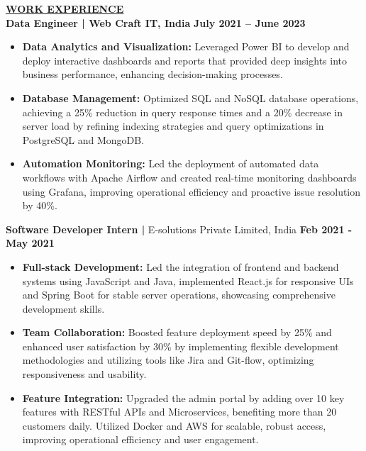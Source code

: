 \documentclass{article}
\begin{document}
\noindent \textbf{\underline{WORK EXPERIENCE}} \\
\noindent \textbf{Data Engineer | Web Craft IT, India}  \hfill \textbf{July 2021 – June 2023}
\begin{itemize}[noitemsep,nolistsep,leftmargin=*]
\item {\small \textbf{Data Analytics and Visualization:} Leveraged Power BI to develop and deploy interactive dashboards and reports that provided deep insights into business performance, enhancing decision-making processes.}
\item {\small \textbf{Database Management:} Optimized SQL and NoSQL database operations, achieving a 25\% reduction in query response times and a 20\% decrease in server load by refining indexing strategies and query optimizations in PostgreSQL and MongoDB.}
\item {\small \textbf{Automation Monitoring:} Led the deployment of automated data workflows with Apache Airflow and created real-time monitoring dashboards using Grafana, improving operational efficiency and proactive issue resolution by 40\%.}
\end{itemize}
\begin{itemize}
\end{itemize}
\noindent \textbf{Software Developer Intern | } E-solutions Private Limited, India \hfill \textbf{Feb 2021 - May 2021}
\begin{itemize}[noitemsep,nolistsep,leftmargin=*]
\item {\small \textbf{Full-stack Development:} Led the integration of frontend and backend systems using JavaScript and Java, implemented React.js for responsive UIs and Spring Boot for stable server operations, showcasing comprehensive development skills.}
\item {\small \textbf{Team Collaboration:} Boosted feature deployment speed by 25\% and enhanced user satisfaction by 30\% by implementing flexible development methodologies and utilizing tools like Jira and Git-flow, optimizing responsiveness and usability.}
\item {\small \textbf{Feature Integration:} Upgraded the admin portal by adding over 10 key features with RESTful APIs and Microservices, benefiting more than 20 customers daily. Utilized Docker and AWS for scalable, robust access, improving operational efficiency and user engagement.}
\end{itemize}
\begin{itemize}
\end{itemize}
\end{document}
